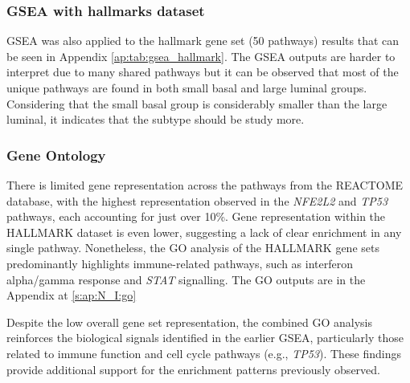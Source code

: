 \subsubsection*{GSEA with hallmarks dataset}


GSEA was also applied to the hallmark gene set (50 pathways) results that can be seen in Appendix \cref{ap:tab:gsea_hallmark}. The GSEA outputs are harder to interpret due to many shared pathways but it can be observed that most of the unique pathways are found in both small basal and large luminal groups. Considering that the small basal group is considerably smaller than the large luminal, it indicates that the subtype should be study more.

\subsubsection*{Gene Ontology} \label{s:N_I:sel_tfs_go}

There is limited gene representation across the pathways from the REACTOME database, with the highest representation observed in the \textit{NFE2L2} and \textit{TP53} pathways, each accounting for just over 10\%. Gene representation within the HALLMARK dataset is even lower, suggesting a lack of clear enrichment in any single pathway. Nonetheless, the GO analysis of the HALLMARK gene sets predominantly highlights immune-related pathways, such as interferon alpha/gamma response and \textit{STAT} signalling. The GO outputs are in the Appendix at \cref{s:ap:N_I:go}

Despite the low overall gene set representation, the combined GO analysis reinforces the biological signals identified in the earlier GSEA, particularly those related to immune function and cell cycle pathways (e.g., \textit{TP53}). These findings provide additional support for the enrichment patterns previously observed.


